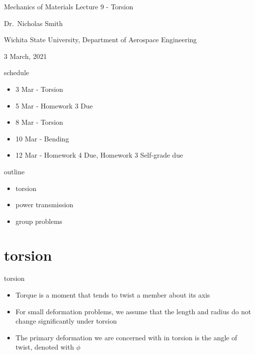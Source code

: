 \documentclass[
  letterpaper,
  ignorenonframetext,
  aspectratio=43,
  handout,
  12pt]{beamer}
\author{}
\date{}
\providecommand{\tightlist}{%
  \setlength{\itemsep}{0pt}\setlength{\parskip}{0pt}}
\providecommand{\tightlist}{%
\setlength{\itemsep}{0pt}\setlength{\parskip}{0pt}}
\begin{document}
\begin{frame}{Mechanics of Materials}
\protect\hypertarget{mechanics-of-materials}{}
Lecture 9 - Torsion

Dr.~Nicholas Smith

Wichita State University, Department of Aerospace Engineering

3 March, 2021
\end{frame}

\begin{frame}{schedule}
\protect\hypertarget{schedule}{}
\begin{itemize}
\tightlist
\item
  3 Mar - Torsion
\item
  5 Mar - Homework 3 Due
\item
  8 Mar - Torsion
\item
  10 Mar - Bending
\item
  12 Mar - Homework 4 Due, Homework 3 Self-grade due
\end{itemize}
\end{frame}

\begin{frame}{outline}
\protect\hypertarget{outline}{}
\begin{itemize}
\tightlist
\item
  torsion
\item
  power transmission
\item
  group problems
\end{itemize}
\end{frame}

\hypertarget{torsion}{%
\section{torsion}\label{torsion}}

\begin{frame}{torsion}
\protect\hypertarget{torsion-1}{}
\begin{itemize}
\tightlist
\item
  Torque is a moment that tends to twist a member about its axis
\item
  For small deformation problems, we assume that the length and radius
  do not change significantly under torsion
\item
  The primary deformation we are concerned with in torsion is the angle
  of twist, denoted with \(\phi\)
\end{itemize}
\end{frame}
\end{document}
